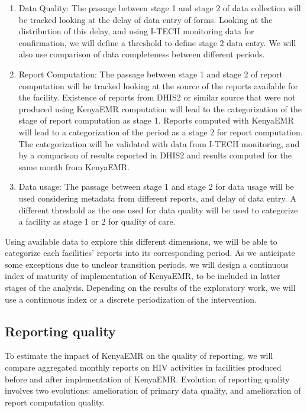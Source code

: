\documentclass[a4paper,11pt,final,twoside]{article}
\begin{document}
\begin{enumerate}
\item    Data Quality: The passage between stage 1 and stage 2 of data collection will be tracked looking at the delay of data entry of forms. Looking at the distribution of this delay, and using I-TECH monitoring data for confirmation, we will define a threshold to define stage 2 data entry. We will also use comparison of data completeness between different periods.
\item	Report Computation: The passage between stage 1 and stage 2 of report computation will be tracked looking at the source of the reports available for the facility. Existence of reports from DHIS2 or similar source that were not produced using KenyaEMR computation will lead to the categorization of the stage of report computation as stage 1. Reports computed with KenyaEMR will lead to a categorization of the period as a stage 2 for report computation. The categorization will be validated with data from I-TECH monitoring, and by a comparison of results reported in DHIS2 and results computed for the same month from KenyaEMR.
\item	Data usage: The passage between stage 1 and stage 2 for data usage will be used considering metadata from different reports, and delay of data entry. A different threshold as the one used for data quality will be used to categorize a facility as stage 1 or 2 for quality of care.
\end{enumerate}

Using available data to explore this different dimensions, we will be able to categorize each facilities’ reports into its corresponding period. As we anticipate some exceptions due to unclear transition periods, we will design a continuous index of maturity of implementation of KenyaEMR, to be included in latter stages of the analysis. Depending on the results of the exploratory work, we will use a continuous index or a discrete periodization of the intervention.

\subsection{Reporting quality}
To estimate the impact of KenyaEMR on the quality of reporting, we will compare aggregated monthly reports on HIV activities in facilities produced before and after implementation of KenyaEMR. Evolution of reporting quality involves two evolutions: amelioration of primary data quality, and amelioration of report computation quality.
\end{document}
